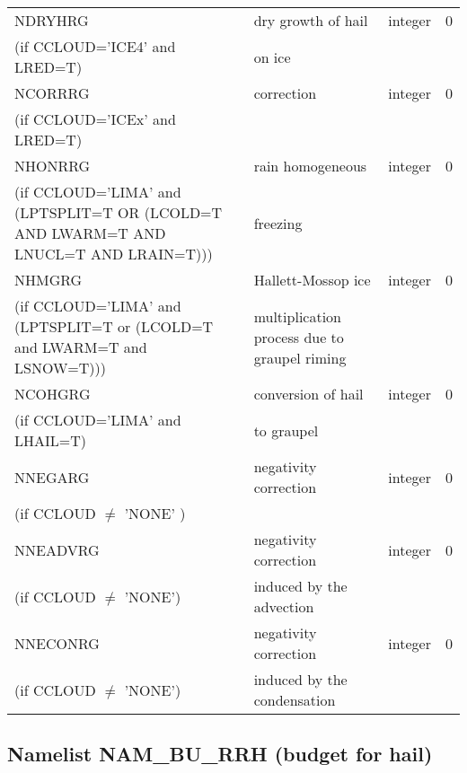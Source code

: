\begin{longtable} {|p{}|p{}|>{\centering}p{}|p{}<{\centering}|}
NDRYHRG&    dry growth of hail& integer  &  0 \index{NDRYHRG!\innam{NAM\_BU\_RRG}}\\ \nopagebreak
(if CCLOUD='ICE4' and LRED=T) &  on ice&   &  \\\hline
NCORRRG&   correction & integer  &  0 \index{NCORRRG!\innam{NAM\_BU\_RRG}}\\ \nopagebreak
(if CCLOUD='ICEx' and LRED=T) &  &   &  \\\hline
NHONRRG  & rain homogeneous  & integer  &  0 \index{NHONRRG!\innam{NAM\_BU\_RRG}}\\ \nopagebreak
(if CCLOUD='LIMA' and (LPTSPLIT=T OR (LCOLD=T AND LWARM=T AND LNUCL=T AND LRAIN=T)))   & freezing  &       &   \\\hline
NHMGRG  & Hallett-Mossop ice  & integer  &  0 \index{NHMGRG!\innam{NAM\_BU\_RRG}}\\ \nopagebreak
(if CCLOUD='LIMA' and (LPTSPLIT=T or (LCOLD=T and LWARM=T and LSNOW=T))) & multiplication process due to graupel riming  &   &  \\\hline
NCOHGRG  & conversion of hail  & integer  &  0 \index{NCOHGRG!\innam{NAM\_BU\_RRG}}\\ \nopagebreak
(if CCLOUD='LIMA' and LHAIL=T) &to graupel  &   &  \\\hline
NNEGARG   & negativity correction & integer  &  0 \index{NNEGARG!\innam{NAM\_BU\_RRG}}\\ \nopagebreak
(if CCLOUD $\neq$ 'NONE' )& &   &  \\\hline
NNEADVRG  & negativity correction  & integer  &  0 \index{NNEADVRG!\innam{NAM\_BU\_RRG}}\\ \nopagebreak
(if CCLOUD $\neq$ 'NONE') & induced by the advection&   &  \\\hline
NNECONRG  &negativity correction    & integer  &  0 \index{NNECONRG!\innam{NAM\_BU\_RRG}}\\ \nopagebreak
(if CCLOUD $\neq$ 'NONE') &induced by the condensation &   &  \\\hline
\end{longtable}

\subsection{Namelist NAM\_BU\_RRH (budget for hail)}

